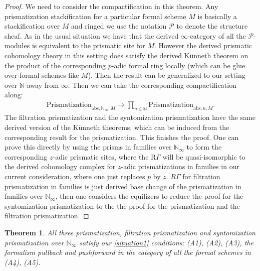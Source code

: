 \documentclass[12pt]{article}
\newtheorem{theorem}{Theorem}
\theoremstyle{definition}
\begin{document}
\begin{proof}
We need to consider the compactification in this theorem. Any prismatization  stackification for a particular formal scheme $M$ is basically a stackification over $M$ and ringed we use the notation $\mathcal{P}$ to denote the structure sheaf. As in the usual situation we have that the derived $\infty$-category of all the $\mathcal{P}$-modules is equivalent to the prismatic site for $M$. However the derived prismatic cohomology theory in this setting does satisfy the derived K\"unneth theorem on the product of the corresponding $p$-adic formal ring locally (which can be glue over formal schemes like $M$). Then the result can be generalized to our setting over $\mathbb{N}$ away from $\infty$. Then we can take the corresponding compactification along:
\begin{align}
{\underline{\mathrm{Prismatization}}}_{\mathrm{abs},\mathbb{N}_\infty,M}\rightarrow  \prod_{n\in \mathbb{N}} {\underline{\mathrm{Prismatization}}}_{\mathrm{abs},n,M}.
\end{align}
The filtration prismatization and the syntomization prismatization have the same derived version of the K\"unneth theorems, which can be induced from the corresponding result for the prismatization. This finishes the proof. One can prove this directly by using the prisms in families over $\mathbb{N}_\infty$ to form the corresponding $z$-adic prismatic sites, where the $\mathrm{R}\Gamma$ will be quasi-isomorphic to the derived cohomology complex for $z$-adic prismatizations in families in our current consideration, where one just replaces $p$ by $z$. $R\Gamma$ for filtration prismatization in families is just derived base change of the prismatization in families over $\mathbb{N}_\infty$, then one considers the equilizers to reduce the proof for the syntomization prismatization to the the proof for the prismatization and the filtration prismatization.
 \end{proof}

\begin{theorem}
All three prismatization, filtration prismatization and syntomization prismatization over $\mathbb{N}_\infty$ satisfy our \cref{situation1} conditions: (A1), (A2), (A3), the formalism pullback and pushforward in the category of all the formal schemes in (A4), (A5).
\end{theorem}
\end{document}
